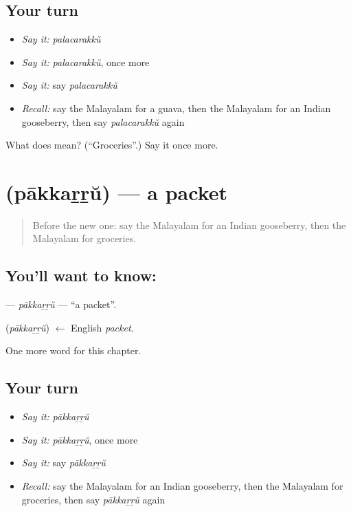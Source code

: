 \subsection*{Your turn}
\begin{itemize}
\raggedright
  \item \emph{Say it:} \emph{palacarakkŭ}
  \item \emph{Say it:} \emph{palacarakkŭ}, once more
  \item \emph{Say it:} say \emph{palacarakkŭ}
  \item \emph{Recall:} say the Malayalam for a guava, then the Malayalam for an Indian gooseberry, then say \emph{palacarakkŭ} again
\end{itemize}

\begin{tcolorbox}[breakable,colback=teal!4,colframe=teal!35!black,title={Before you move on}]
What does  mean? (\textquotedblleft{}Groceries\textquotedblright{}.) Say it once more.
\end{tcolorbox}
\section[\texorpdfstring{\ml{പാക്കറ്റ്} (pākkaṟṟŭ)}{പാക്കറ്റ് (pākkaṟṟŭ)}]{ (pākkaṟṟŭ) — a packet}

\label{lesson:ML-C298-pakkarru}



\begin{quote}
Before the new one: say the Malayalam for an Indian gooseberry, then the Malayalam for groceries.
\end{quote}

\subsection*{You'll want to know: }
\textbf{} — \emph{pākkaṟṟŭ} — \textquotedblleft{}a packet\textquotedblright{}.

\begin{cousinweb}
\textbf{} (\emph{pākkaṟṟŭ}) $\leftarrow$ English \emph{packet}.
\end{cousinweb}

\begin{grammarlens}[title={What you've built}]
One more word for this chapter.
\end{grammarlens}

\subsection*{Your turn}
\begin{itemize}
\raggedright
  \item \emph{Say it:} \emph{pākkaṟṟŭ}
  \item \emph{Say it:} \emph{pākkaṟṟŭ}, once more
  \item \emph{Say it:} say \emph{pākkaṟṟŭ}
  \item \emph{Recall:} say the Malayalam for an Indian gooseberry, then the Malayalam for groceries, then say \emph{pākkaṟṟŭ} again
\end{itemize}

